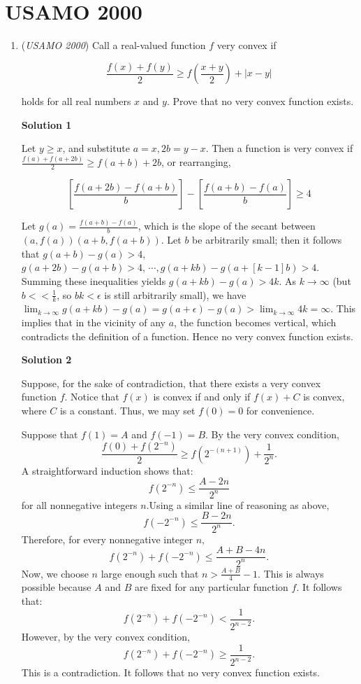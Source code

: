 \section{USAMO 2000}
        \begin{enumerate}
        	\item (\textit{USAMO 2000}) Call a real-valued function $f$ very convex if


 
 \[\frac {f(x) + f(y)}{2} \ge f\left(\frac {x + y}{2}\right) + |x - y|\]


 holds for all real numbers $x$ and $y$. Prove that no very convex function exists.


 



\textbf{Solution 1}

Let $y \ge x$, and substitute $a = x, 2b = y-x$. Then a function is very convex if $\frac{f(a) + f(a+2b)}{2} \ge f(a + b) + 2b$, or rearranging,

 
 \[\left[\frac{f(a+2b)-f(a+b)}{b}\right]-\left[\frac{f(a+b)-f(a)}{b}\right] \ge 4\]

 Let $g(a) = \frac{f(a+b) - f(a)}{b}$, which is the slope of the secant between $(a,f(a))(a+b,f(a+b))$. Let $b$ be arbitrarily small; then it follows that $g(a+b) - g(a) > 4$, $g(a+2b) - g(a+b) > 4,\, \cdots, g(a+kb) - g(a+ [k-1]b) > 4$. Summing these inequalities yields $g(a+kb)-g(a) > 4k$. As $k \rightarrow \infty$ (but $b << \frac{1}{k}$, so $bk < \epsilon$ is still arbitrarily small), we have $\lim_{k \rightarrow \infty} g(a+kb) - g(a) = g(a + \epsilon) - g(a) > \lim_{k \rightarrow \infty} 4k = \infty$. This implies that in the vicinity of any $a$, the function becomes vertical, which contradicts the definition of a function. Hence no very convex function exists.

 


 



\textbf{Solution 2}

Suppose, for the sake of contradiction, that there exists a very convex function $f.$ Notice that $f(x)$ is convex if and only if $f(x) + C$ is convex, where $C$ is a constant. Thus, we may set $f(0) = 0$ for convenience.

 Suppose that $f(1) = A$ and $f(-1) = B.$ By the very convex condition,
 \[\frac{f(0) + f\left(2^{-n}\right)}{2} \ge f\left(2^{-(n+1)}\right) + \frac{1}{2^n}.\]A straightforward induction shows that:
 \[f\left(2^{-n}\right) \le \frac{A - 2n}{2^n}\]for all nonnegative integers $n.$Using a similar line of reasoning as above,
 \[f\left(-2^{-n}\right) \le \frac{B - 2n}{2^n}.\]Therefore, for every nonnegative integer $n,$
 \[f\left(2^{-n}\right) + f\left(-2^{-n}\right) \le \frac{A+B-4n}{2^n}.\]Now, we choose $n$ large enough such that $n > \frac{A+B}{4} - 1.$ This is always possible because $A$ and $B$ are fixed for any particular function $f.$ It follows that:
 \[f\left(2^{-n}\right) + f\left(-2^{-n}\right) < \frac{1}{2^{n-2}}.\]However, by the very convex condition,
 \[f\left(2^{-n}\right) + f\left(-2^{-n}\right) \ge \frac{1}{2^{n-2}}.\]This is a contradiction. It follows that no very convex function exists.


\end{enumerate}
